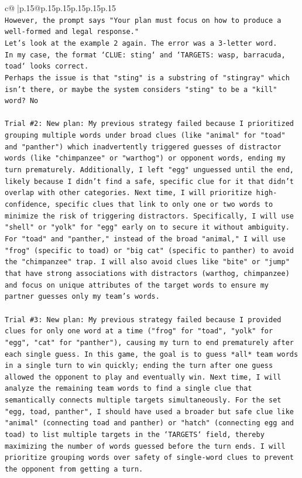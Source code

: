\documentclass{article}
\begin{document}
{\begin{supertabular}{c@{$\;$}|p{.15\linewidth}@{}p{.15\linewidth}p{.15\linewidth}p{.15\linewidth}p{.15\linewidth}p{.15\linewidth}}
{{{\\ 
\texttt{However, the prompt says "Your plan must focus on how to produce a well{-}formed and legal response."} \\
\texttt{Let's look at the example 2 again. The error was a 3{-}letter word.} \\
\texttt{In my case, the format `CLUE: sting` and `TARGETS: wasp, barracuda, toad` looks correct.} \\
\texttt{Perhaps the issue is that "sting" is a substring of "stingray" which isn't there, or maybe the system considers "sting" to be a "kill" word? No} \\
\\ 
\texttt{Trial \#2: New plan: My previous strategy failed because I prioritized grouping multiple words under broad clues (like "animal" for "toad" and "panther") which inadvertently triggered guesses of distractor words (like "chimpanzee" or "warthog") or opponent words, ending my turn prematurely. Additionally, I left "egg" unguessed until the end, likely because I didn't find a safe, specific clue for it that didn't overlap with other categories. Next time, I will prioritize high{-}confidence, specific clues that link to only one or two words to minimize the risk of triggering distractors. Specifically, I will use "shell" or "yolk" for "egg" early on to secure it without ambiguity. For "toad" and "panther," instead of the broad "animal," I will use "frog" (specific to toad) or "big cat" (specific to panther) to avoid the "chimpanzee" trap. I will also avoid clues like "bite" or "jump" that have strong associations with distractors (warthog, chimpanzee) and focus on unique attributes of the target words to ensure my partner guesses only my team's words.} \\
\\ 
\texttt{Trial \#3: New plan: My previous strategy failed because I provided clues for only one word at a time ("frog" for "toad", "yolk" for "egg", "cat" for "panther"), causing my turn to end prematurely after each single guess. In this game, the goal is to guess *all* team words in a single turn to win quickly; ending the turn after one guess allowed the opponent to play and eventually win. Next time, I will analyze the remaining team words to find a single clue that semantically connects multiple targets simultaneously. For the set "egg, toad, panther", I should have used a broader but safe clue like "animal" (connecting toad and panther) or "hatch" (connecting egg and toad) to list multiple targets in the `TARGETS` field, thereby maximizing the number of words guessed before the turn ends. I will prioritize grouping words over safety of single{-}word clues to prevent the opponent from getting a turn.} \\
}}}
\end{supertabular}}
\end{document}
